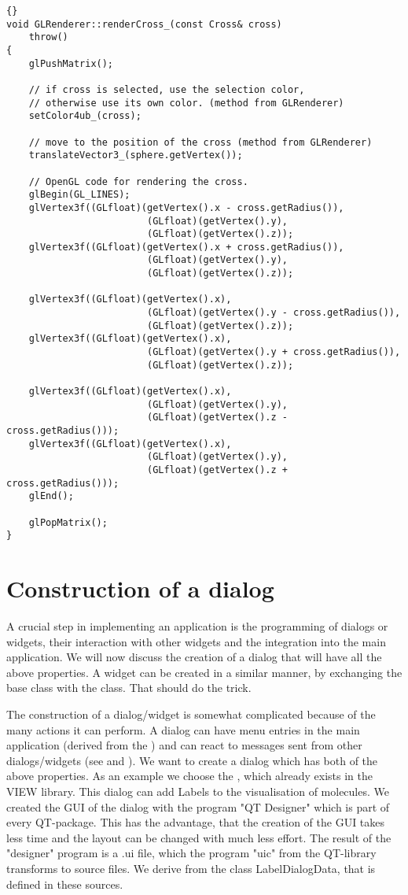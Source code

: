 \begin{lstlisting}{}
void GLRenderer::renderCross_(const Cross& cross)
	throw() 
{
	glPushMatrix();
	
	// if cross is selected, use the selection color,
	// otherwise use its own color. (method from GLRenderer)
	setColor4ub_(cross);  
	
	// move to the position of the cross (method from GLRenderer)
	translateVector3_(sphere.getVertex());
	
	// OpenGL code for rendering the cross.
	glBegin(GL_LINES);
	glVertex3f((GLfloat)(getVertex().x - cross.getRadius()),
						 (GLfloat)(getVertex().y),
						 (GLfloat)(getVertex().z));
	glVertex3f((GLfloat)(getVertex().x + cross.getRadius()),
						 (GLfloat)(getVertex().y),
						 (GLfloat)(getVertex().z));

	glVertex3f((GLfloat)(getVertex().x),
						 (GLfloat)(getVertex().y - cross.getRadius()),
						 (GLfloat)(getVertex().z));
	glVertex3f((GLfloat)(getVertex().x),
						 (GLfloat)(getVertex().y + cross.getRadius()),
						 (GLfloat)(getVertex().z));

	glVertex3f((GLfloat)(getVertex().x),
						 (GLfloat)(getVertex().y),
						 (GLfloat)(getVertex().z - cross.getRadius()));
	glVertex3f((GLfloat)(getVertex().x),
						 (GLfloat)(getVertex().y),
						 (GLfloat)(getVertex().z + cross.getRadius()));
	glEnd();

	glPopMatrix();
}
\end{lstlisting}


\section{Construction of a dialog}
\label{section:view_construction_of_a_dialog}

A crucial step in implementing an application is the programming of dialogs or
widgets, their interaction with other widgets and the integration into the
main application. We will now discuss the creation of a dialog that will have
all the above properties. A widget can be created in a similar manner, by
exchanging the  base class with the  class. That
should do the trick.

The construction of a dialog/widget is somewhat complicated because of the
many actions it can perform. A dialog can have menu entries in the main
application (derived from the ) and can react to messages
sent from other dialogs/widgets (see  and
). We want to create a dialog which has both of the
above properties. As an example we choose the , which already
exists in the VIEW library. This dialog can add Labels to the visualisation of
molecules.
We created the GUI of the dialog with the program "QT Designer" which is part
of every QT-package. This has the advantage, that the creation of the GUI takes
less time and the layout can be changed with much less effort. 
The result of the "designer" program is a .ui file, which the program "uic"
from the QT-library transforms to source files. We derive from the class
LabelDialogData, that is defined in these sources.

